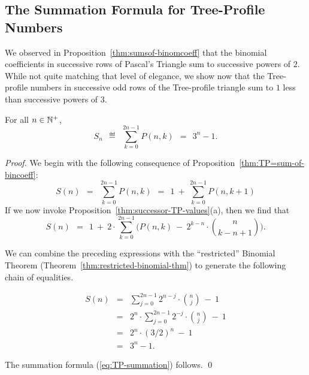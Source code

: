 \subsection{The Summation Formula for Tree-Profile Numbers}

We observed in Proposition~\ref{thm:sumsof-binomcoeff} that the binomial coefficients in successive rows of Pascal's Triangle sum to successive powers of $2$.  While not quite matching that level of elegance, we show now that the Tree-profile numbers in successive odd rows of the Tree-profile triangle sum to $1$ less than successive powers of $3$.

\begin{prop}
\label{thm:TP-summation}
For all $n \in \mathbb{N}^+$,
\begin{equation}
\label{eq:TP-summation}
S_n \ \ \eqdef \ \ \sum_{k=0}^{2n-1} P(n,k) \ \ = \ \ 3^n -1.
\end{equation}
\end{prop}
 
\begin{proof}
We begin with the following consequence of Proposition~\ref{thm:TP=sum-of-bincoeff}:
\[  S(n) \ \ = \ \  \sum_{k=0}^{2n-1} P(n,k)  \ \ = \ \  1 \ + \ \sum_{k=0}^{2n-1} P(n,k+1) \]
If we now invoke Proposition~\ref{thm:successor-TP-values}(a), then we find that
\[
S(n) \ \ = \ \ 
1 \ + \ 2 \cdot \sum_{k=0}^{2n-1}   \big( P(n,k) \ - \ 2^{k-n} \cdot {n \choose {k-n+1}} \big).
\]

We can combine the preceding expressions with the ``restricted'' Binomial Theorem (Theorem~\ref{thm:restricted-binomial-thm}) to generate the following chain of equalities.

\begin{eqnarray*}
S(n) & = & 
\sum_{j=0}^{2n-1} 2^{n-j} \cdot {n \choose j} \ - \ 1  \\
     & = &
2^n \cdot \sum_{j=0}^{2n-1} 2^{-j}  \cdot {n \choose j} \ - \ 1 \\
     & = & 
2^n \cdot (3/2)^n \ - \ 1 \\
     & = &
3^n -1.
\end{eqnarray*}

The summation formula (\ref{eq:TP-summation}) follows.  \qed
\end{proof}
 


